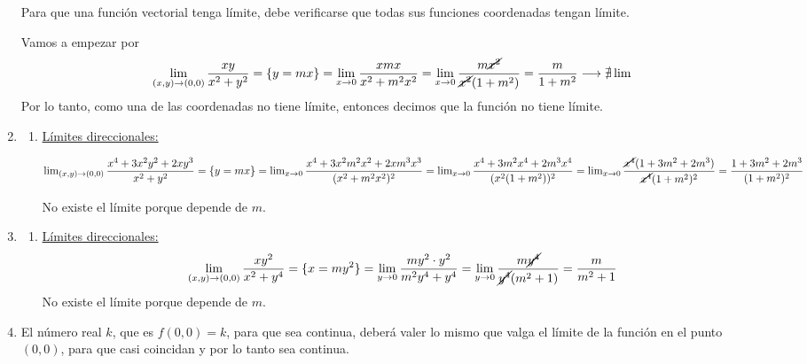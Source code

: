 \begin{enumerate}[label=\color{red}\textbf{\arabic*)}, leftmargin=*]
		Para que una función vectorial tenga límite, debe verificarse que todas sus funciones coordenadas tengan límite.
		
		Vamos a empezar por \[ \lim_{(x,y)\to(0,0)}\dfrac{xy}{x^2+y^2}=\{y=mx\}=\lim_{x\to0}\dfrac{xmx}{x^2+m^2x^2}=\lim_{x\to0}\dfrac{m\cancel{x^2}}{\cancel{x^2}(1+m^2)}=\dfrac{m}{1+m^2}\longrightarrow\nexists\lim \]
		Por lo tanto, como una de las coordenadas no tiene límite, entonces decimos que la función no tiene límite.
		\item {}
		\begin{enumerate}[label=\arabic*)]
			\item \underline{Límites direccionales:}
			
			$\lim_{(x,y)\to(0,0)}\dfrac{x^4+3x^2y^2+2xy^3}{x^2+y^2}=\{y=mx\}=\lim_{x\to0}\dfrac{x^4+3x^2m^2x^2+2xm^3x^3}{(x^2+m^2x^2)^2}=\lim_{x\to0}\dfrac{x^4+3m^2x^4+2m^3x^4}{(x^2(1+m^2))^2}=\lim_{x\to0}\dfrac{\cancel{x^4}(1+3m^2+2m^3)}{\cancel{x^4}(1+m^2)^2}=\dfrac{1+3m^2+2m^3}{(1+m^2)^2}$
			
			No existe el límite porque depende de $m$.
			
		\end{enumerate}
		\item {}
			\begin{enumerate}[label=\arabic*)]
				\item \underline{Límites direccionales:} \[ \lim_{(x,y)\to(0,0)}\dfrac{xy^2}{x^2+y^4}=\{x=my^2\}=\lim_{y\to0}\dfrac{my^2\cdot y^2}{m^2y^4+y^4}=\lim_{y\to0}\dfrac{m\cancel{y^4}}{\cancel{y^4}(m^2+1)}=\dfrac{m}{m^2+1} \] No existe el límite porque depende de $m$.
			\end{enumerate}
		\item {}
		
		El número real $k$, que es $f(0,0)=k$, para que sea continua, deberá valer lo mismo que valga el límite de la función en el punto $(0,0)$, para que casi coincidan y por lo tanto sea continua.
		

\end{enumerate}
